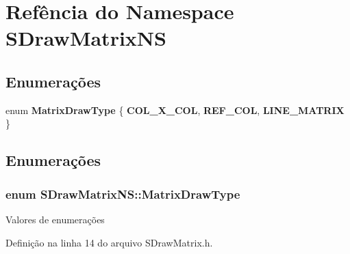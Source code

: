\section{Refência do Namespace S\+Draw\+Matrix\+NS}
\label{namespace_s_draw_matrix_n_s}
\subsection*{Enumerações}
\begin{DoxyCompactItemize}
\item 
enum {\bf Matrix\+Draw\+Type} \{ {\bf C\+O\+L\+\_\+\+X\+\_\+\+C\+OL}, 
{\bf R\+E\+F\+\_\+\+C\+OL}, 
{\bf L\+I\+N\+E\+\_\+\+M\+A\+T\+R\+IX}
 \}
\end{DoxyCompactItemize}


\subsection{Enumerações}
\subsubsection[{Matrix\+Draw\+Type}]{\setlength{\rightskip}{0pt plus 5cm}enum {\bf S\+Draw\+Matrix\+N\+S\+::\+Matrix\+Draw\+Type}}\label{namespace_s_draw_matrix_n_s_ad846bcd1a5aaf7be55ac63dbdea68604}
\begin{Desc}
\item[Valores de enumerações]\par
\begin{description}
\item[{\em 
C\+O\+L\+\_\+\+X\+\_\+\+C\+OL\label{namespace_s_draw_matrix_n_s_ad846bcd1a5aaf7be55ac63dbdea68604a038cbf42aef2b6d514359ba85c5c5d56}
}]\item[{\em 
R\+E\+F\+\_\+\+C\+OL\label{namespace_s_draw_matrix_n_s_ad846bcd1a5aaf7be55ac63dbdea68604a4fa3a69122addec1ca63271d30258d8b}
}]\item[{\em 
L\+I\+N\+E\+\_\+\+M\+A\+T\+R\+IX\label{namespace_s_draw_matrix_n_s_ad846bcd1a5aaf7be55ac63dbdea68604a5988da92a43515b597b5d96b1e7589cc}
}]\end{description}
\end{Desc}


Definição na linha 14 do arquivo S\+Draw\+Matrix.\+h.

